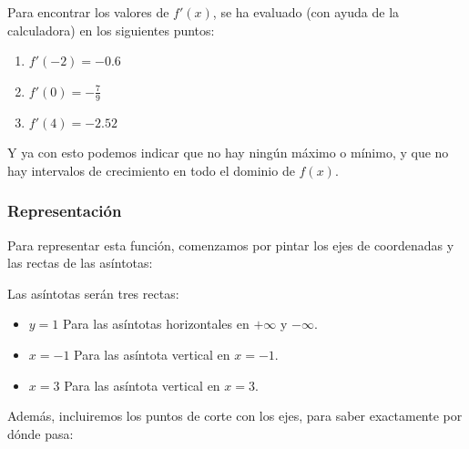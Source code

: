 \documentclass[sans]{apuntes}
\begin{document}
\begin{examplebox}
	\begin{center}
	\end{center}
	

	Para encontrar los valores de $f'(x)$, se ha evaluado (con ayuda de la calculadora) en los siguientes puntos:
	\begin{enumerate}
		\item $f'(-2) = \num{-0.6}$
		\item $f'(0) = -\frac{7}{9}$
		\item $f'(4) = \num{-2.52}$
	\end{enumerate}

	Y ya con esto podemos indicar que no hay ningún máximo o mínimo, y que no hay intervalos de crecimiento en todo el dominio de $f(x)$.

	\subsubsection*{Representación}
	Para representar esta función, comenzamos por pintar los ejes de coordenadas y las rectas de las asíntotas:
	\par Las asíntotas serán tres rectas:
	\begin{itemize}
		\item $y = 1$ Para las asíntotas horizontales en $+\infty$ y $-\infty$.
		\item $x = -1$ Para las asíntota vertical en $x = -1$.
		\item $x = 3$ Para las asíntota vertical en $x = 3$.
	\end{itemize}

	Además, incluiremos los puntos de corte con los ejes, para saber exactamente por dónde pasa:


\end{examplebox}
\end{document}
